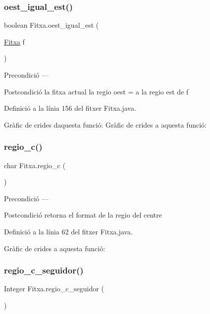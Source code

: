 \subsubsection{\texorpdfstring{oest\+\_\+igual\+\_\+est()}{oest\_igual\_est()}}
{\footnotesize\ttfamily boolean Fitxa.\+oest\+\_\+igual\+\_\+est (\begin{DoxyParamCaption}\item[{\mbox{\hyperlink{class_fitxa}{Fitxa}}}]{f }\end{DoxyParamCaption})}

\begin{DoxyPrecond}{Precondició}
--- 
\end{DoxyPrecond}
\begin{DoxyPostcond}{Postcondició}
la fitxa actual la regio oest = a la regio est de f 
\end{DoxyPostcond}


Definició a la línia 156 del fitxer Fitxa.\+java.

Gràfic de crides d\textquotesingle{}aquesta funció\+:
Gràfic de crides a aquesta funció\+:
\mbox{\label{class_fitxa_a7cc0281785388d498da748080c42083e}} 
\subsubsection{\texorpdfstring{regio\+\_\+c()}{regio\_c()}}
{\footnotesize\ttfamily char Fitxa.\+regio\+\_\+c (\begin{DoxyParamCaption}{ }\end{DoxyParamCaption})}

\begin{DoxyPrecond}{Precondició}
--- 
\end{DoxyPrecond}
\begin{DoxyPostcond}{Postcondició}
retorna el format de la regio del centre 
\end{DoxyPostcond}


Definició a la línia 62 del fitxer Fitxa.\+java.

Gràfic de crides a aquesta funció\+:
\mbox{\label{class_fitxa_a37104d196a82d324bedaa4a9294758bc}} 
\subsubsection{\texorpdfstring{regio\+\_\+c\+\_\+seguidor()}{regio\_c\_seguidor()}}
{\footnotesize\ttfamily Integer Fitxa.\+regio\+\_\+c\+\_\+seguidor (\begin{DoxyParamCaption}{ }\end{DoxyParamCaption})}

